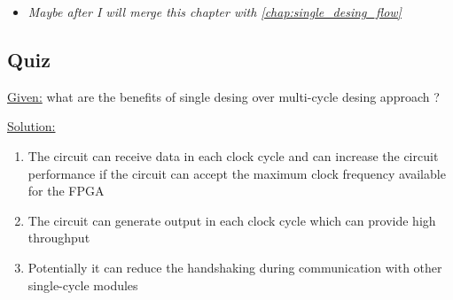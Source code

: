  

\begin{itemize}

\item \textit{Maybe after I will merge this chapter with \autoref{chap:single_desing_flow} }

\end{itemize}

\subsection{Quiz}

\underline{Given:} what are the benefits of single desing over multi-cycle desing approach ?

\underline{Solution:}

\begin{enumerate}

\item The circuit can receive data in each clock cycle and can increase the
circuit performance if the circuit can accept the maximum clock
frequency available for the FPGA

\item The circuit can generate output in each clock cycle which can provide
high throughput

\item Potentially it can reduce the handshaking during communication with
other single-cycle modules
 
\end{enumerate}








 







